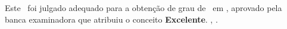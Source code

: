 

\begin{folhadeaprovacao}

  \begin{center}
    {\ABNTEXchapterfont\large\imprimirautor}

    \vspace*{\fill}\vspace*{\fill}
    {\ABNTEXchapterfont\bfseries\Large\imprimirtitulo}
    \vspace*{\fill}
    
    \hspace{.45\textwidth}
    \begin{minipage}{.5\textwidth}
        \imprimirpreambulo
    \end{minipage}%
    \vspace*{\fill}
  \end{center}
    
   Este \imprimirtipotrabalho\ foi julgado adequado para a obtenção de grau de \imprimirgrauacademico\ em \imprimircurso, aprovado pela banca examinadora que atribuiu o conceito \textbf{Excelente}. \imprimirlocal, \imprimirdatadaaprovacao.

   \vspace*{\fill}





   \begin{center}

   \vspace*{\fill}
   \large \textsc \imprimirlocal \\
   \large \textsc \imprimirdata

   \end{center}
      


\end{folhadeaprovacao}

